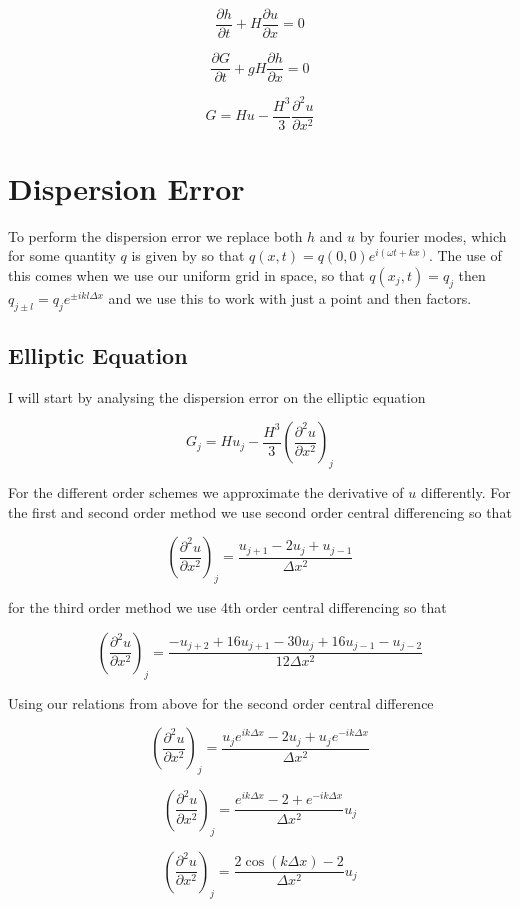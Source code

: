 \documentclass[12pt]{article}
\begin{document}
\[\frac{\partial  h}{\partial  t} + H\frac{\partial  u}{\partial  x} = 0 \]

\[\frac{\partial  G}{\partial  t} + gH\frac{\partial  h}{\partial  x}   = 0 \]

\[G = Hu -\frac{H^3}{3} \frac{\partial^2 u}{\partial x^2}\]

\section{Dispersion Error}
To perform the dispersion error we replace both $h$ and $u$ by fourier modes, which for some quantity $q$ is given by so that
$q(x,t) = q(0,0) e^{i\left(\omega t + kx\right)}$. The use of this comes when we use our uniform grid in space, so that $q(x_j,t) = q_j$ then $q_{j \pm l} = q_j e^{\pm ik l\Delta x} $ and we use this to work with just a point and then factors. 

\subsection{Elliptic Equation}

I will start by analysing the dispersion error on the elliptic equation

\[G_j = Hu_j -\frac{H^3}{3} \left(\frac{\partial^2 u}{\partial x^2}\right)_j\]

For the different order schemes we approximate the derivative of $u$ differently. For the first and second order method we use second order central differencing so that

\[ \left(\frac{\partial^2 u}{\partial x^2}\right)_j = \frac{u_{j+1} - 2u_{j} + u_{j-1}}{\Delta x^2}\]

for the third order method we use 4th order central differencing so that

\[ \left(\frac{\partial^2 u}{\partial x^2}\right)_j = \frac{-u_{j+2} + 16u_{j+1} - 30u_{j} + 16u_{j-1} -u_{j-2}}{12\Delta x^2}\]

Using our relations from above for the second order central difference

\[ \left(\frac{\partial^2 u}{\partial x^2}\right)_j = \frac{u_{j} e^{ik\Delta x} - 2u_{j} + u_{j}e^{-ik\Delta x}}{\Delta x^2}\]

\[ \left(\frac{\partial^2 u}{\partial x^2}\right)_j = \frac{ e^{ik\Delta x} - 2 + e^{-ik\Delta x}}{\Delta x^2} u_{j}\]

\[ \left(\frac{\partial^2 u}{\partial x^2}\right)_j = \frac{ 2\cos\left(k\Delta x\right) - 2 }{\Delta x^2} u_{j}\]
\end{document}

